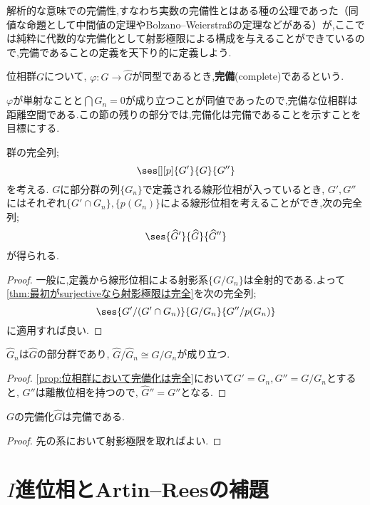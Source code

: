 解析的な意味での完備性,すなわち実数の完備性とはある種の公理であった（同値な命題として中間値の定理やBolzano--Weierstra\ss の定理などがある）が,ここでは純粋に代数的な完備化として射影極限による構成を与えることができているので,完備であることの定義を天下り的に定義しよう.

\begin{defi}[完備]
	位相群$G$について, $\varphi:G\to\widehat{G}$が同型であるとき,\textbf{完備}(complete)であるという.
\end{defi}

$\varphi$が単射なことと$\bigcap G_n=0$が成り立つことが同値であったので,完備な位相群は距離空間である.この節の残りの部分では,完備化は完備であることを示すことを目標にする.

\begin{prop}\label{prop:位相群において完備化は完全}
	群の完全列;
	\[\ses[][p]{G'}{G}{G''}\]
	を考える. $G$に部分群の列$\{G_n\}$で定義される線形位相が入っているとき, $G',G''$にはそれぞれ$\{G'\cap G_n\},\{p(G_n)\}$による線形位相を考えることができ,次の完全列;
	\[\ses{\widehat{G}'}{\widehat{G}}{\widehat{G}''}\]
	が得られる.
\end{prop}

\begin{proof}
	一般に,定義から線形位相による射影系$\{G/G_n\}$は全射的である.よって\ref{thm:最初がsurjectiveなら射影極限は完全}を次の完全列;
	\[\ses{G'/(G'\cap G_n)}{G/G_n}{G''/p(G_n)}\]
	に適用すれば良い.
\end{proof}

\begin{cor}\label{cor:完備化しても商は同型}
	$\widehat{G}_n$は$\widehat{G}$の部分群であり, $\widehat{G}/\widehat{G}_n\cong G/G_n$が成り立つ.
\end{cor}

\begin{proof}
	\ref{prop:位相群において完備化は完全}において$G'=G_n,G''=G/G_n$とすると, $G''$は離散位相を持つので, $\widehat{G}''=G''$となる.
\end{proof}

\begin{cor}
	$G$の完備化$\widehat{G}$は完備である.
\end{cor}

\begin{proof}
	先の系において射影極限を取ればよい.
\end{proof}

\section{$I$進位相とArtin--Reesの補題}

